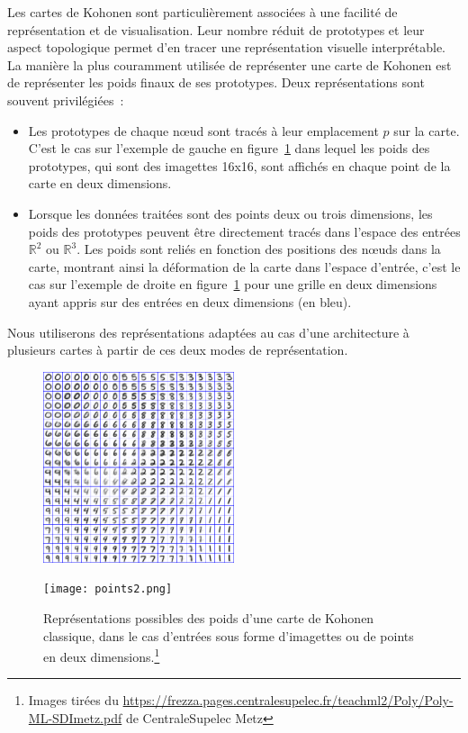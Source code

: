 \documentclass[../main]{subfiles}
\begin{document}
Les cartes de Kohonen sont particulièrement associées à une facilité de représentation et de visualisation. Leur nombre réduit de prototypes et leur aspect topologique permet d'en tracer une représentation visuelle interprétable.
La manière la plus couramment utilisée de représenter une carte de Kohonen est de représenter les poids finaux de ses prototypes. 
Deux représentations sont souvent privilégiées~:
\begin{itemize}
\item Les prototypes de chaque n\oe{}ud sont tracés à leur emplacement $p$ sur la carte. 
C'est le cas sur l'exemple de gauche en figure~\ref{fig:representation} dans lequel les poids des prototypes, qui sont des imagettes 16x16, sont affichés en chaque point de la carte en deux dimensions.
\item Lorsque les données traitées sont des points deux ou trois dimensions, les poids des prototypes peuvent être directement tracés dans l'espace des entrées $\mathbb{R}^2$ ou $\mathbb{R}^3$. Les poids sont reliés en fonction des positions des n\oe{}uds dans la carte, montrant ainsi la déformation de la carte dans l'espace d'entrée, c'est le cas sur l'exemple de droite en figure~\ref{fig:representation} pour une grille en deux dimensions ayant appris sur des entrées en deux dimensions (en bleu).
\end{itemize}

Nous utiliserons des représentations adaptées au cas d'une architecture à plusieurs cartes à partir de ces deux modes de représentation.

\begin{figure}
\begin{minipage}{0.5\textwidth}
\centering
\includegraphics[width=0.5\textwidth]{digits.jpg}
\end{minipage}
\begin{minipage}{0.5\textwidth}
\centering
\texttt{[image: points2.png]}
\end{minipage}
\caption[Représentations classiques des poids d'une carte de Kohonen]{\label{fig:representation} Représentations possibles des poids d'une carte de Kohonen classique, dans le cas d'entrées sous forme d'imagettes ou de points en deux dimensions.\protect\footnote{Images tirées du \protect\href{polycopié d'apprentissage automatique}{https://frezza.pages.centralesupelec.fr/teachml2/Poly/Poly-ML-SDImetz.pdf} de CentraleSupelec Metz}}
\end{figure}
\end{document}
